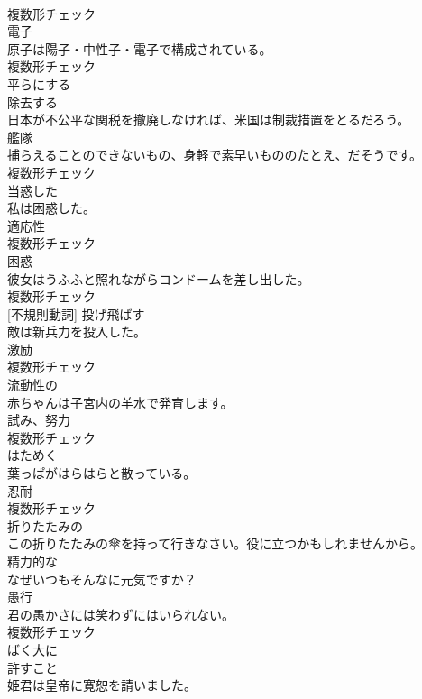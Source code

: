 \documentclass[8pt]{extreport}
\begin{document}
\begin{CJK}{UTF8}{min}
\\	複数形チェック
\\	[名詞]	電子	
\\	原子は陽子・中性子・電子で構成されている。	
\\	複数形チェック
\\	[動詞]	平らにする	
\\	[動詞]	除去する	
\\	日本が不公平な関税を撤廃しなければ、米国は制裁措置をとるだろう。	
\\	[名詞]	艦隊	
\\	捕らえることのできないもの、身軽で素早いもののたとえ、だそうです。	
\\	複数形チェック
\\	[形容詞]	当惑した	
\\	私は困惑した。	
\\	[名詞]	適応性	
\\	複数形チェック
\\	[名詞]	困惑	
\\	彼女はうふふと照れながらコンドームを差し出した。	
\\	複数形チェック
\\	[動詞] [不規則動詞]	投げ飛ばす	
\\	敵は新兵力を投入した。	
\\	[名詞]	激励	
\\	複数形チェック
\\	[形容詞]	流動性の	
\\	赤ちゃんは子宮内の羊水で発育します。	
\\	[名詞]	試み、努力	
\\	複数形チェック
\\	[動詞]	はためく	
\\	葉っぱがはらはらと散っている。	
\\	[名詞]	忍耐	
\\	複数形チェック
\\	[形容詞]	折りたたみの	
\\	この折りたたみの傘を持って行きなさい。役に立つかもしれませんから。	
\\	[形容詞]	精力的な	
\\	なぜいつもそんなに元気ですか？	
\\	[名詞]	愚行	
\\	君の愚かさには笑わずにはいられない。	
\\	複数形チェック
\\	[副詞]	ばく大に	
\\	[名詞]	許すこと	
\\	姫君は皇帝に寛恕を請いました。	

\end{CJK}
\end{document}
